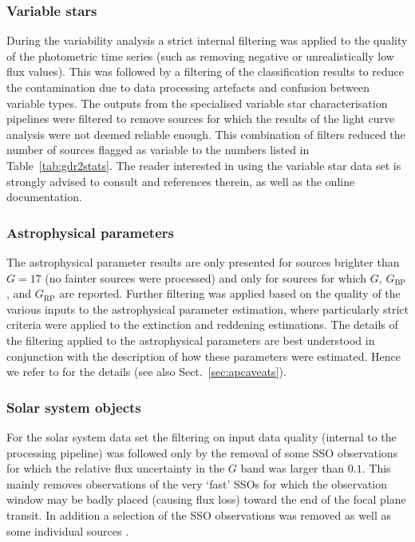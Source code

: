 \documentclass[longauth]{aa_gaia} %
\newcommand\secref[1]{Sect.~\ref{#1}}
\newcommand\tabref[1]{Table~\ref{#1}}
\newcommand\gbp{\ensuremath{G_\mathrm{BP}}}
\newcommand\grp{\ensuremath{G_\mathrm{RP}}}
\begin{document}
\subsubsection{Variable stars}

During the variability analysis a strict internal filtering was applied to the quality of the
photometric time series (such as removing negative or unrealistically low flux values). This
was followed by a filtering of the classification results to reduce the contamination due to data
processing artefacts and confusion between variable types. The outputs from the specialised variable
star characterisation pipelines were filtered to remove sources for which the results of the light
curve analysis were not deemed reliable enough. This combination of filters reduced the number of
sources flagged as variable to the numbers listed in \tabref{tab:gdr2stats}. The reader interested
in using the variable star data set is strongly advised to consult \cite{DR2-DPACP-49} and
references therein, as well as the online documentation.

\subsubsection{Astrophysical parameters}

The astrophysical parameter results are only presented for sources brighter than $G=17$ (no fainter
sources were processed) and only for sources for which $G$, {\gbp}, and {\grp} are reported. Further
filtering was applied based on the quality of the various inputs to the astrophysical parameter
estimation, where particularly strict criteria were applied to the extinction and reddening
estimations. The details of the filtering applied to the astrophysical parameters are best
understood in conjunction with the description of how these parameters were estimated. Hence we
refer to \cite{DR2-DPACP-43} for the details (see also \secref{sec:apcaveats}).

\subsubsection{Solar system objects}

For the solar system data set the filtering on input data quality (internal to the processing
pipeline) was followed only by the removal of some SSO observations for which the relative flux
uncertainty in the $G$ band was larger than $0.1$. This mainly removes observations of the very
`fast' SSOs for which the observation window may be badly placed (causing flux loss) toward the end
of the focal plane transit. In addition a selection of the SSO observations was removed as well as
some individual sources \citep[see][for details]{DR2-DPACP-32}.
\end{document}
